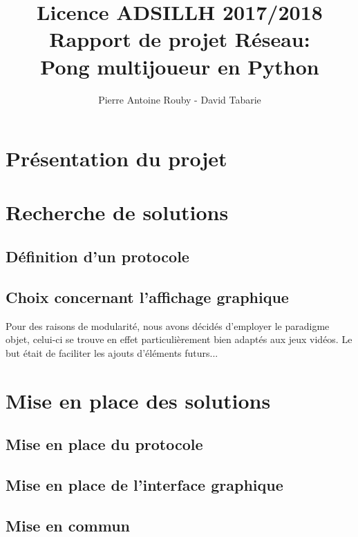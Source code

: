 \documentclass[12pt]{report}
\title{Licence ADSILLH 2017/2018\\Rapport de projet Réseau:\\Pong
  multijoueur en Python}
\author{Pierre Antoine Rouby - David Tabarie\newline}
\date{}
\begin{document}
\maketitle

\begin{abstract}
\end{abstract}
\tableofcontents

\part{Présentation du projet}

\part{Recherche de solutions}
\chapter{Définition d'un protocole}

\chapter{Choix concernant l'affichage graphique} %
Pour des raisons de modularité, nous avons décidés d'employer le
paradigme objet, celui-ci se trouve en effet particulièrement bien
adaptés aux jeux vidéos. Le but était de faciliter les ajouts
d'éléments futurs...

\part{Mise en place des solutions}
\chapter{Mise en place du protocole}

\chapter{Mise en place de l'interface graphique}

\chapter{Mise en commun}
\end{document}
